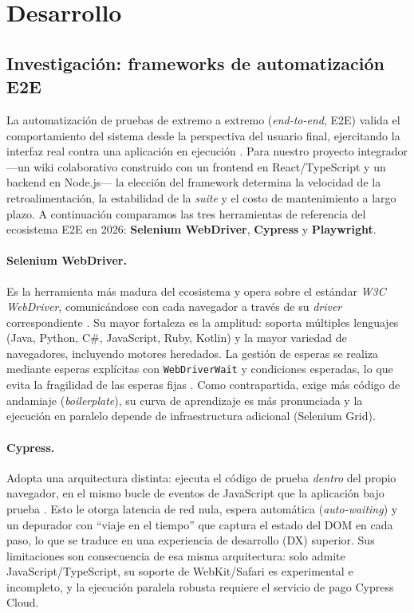 \documentclass[12pt]{article}
\begin{document}
\section{Desarrollo}
\subsection{Investigación: frameworks de automatización E2E}
\label{sec:4-1}

La automatización de pruebas de extremo a extremo (\textit{end-to-end}, E2E) valida
el comportamiento del sistema desde la perspectiva del usuario final, ejercitando la
interfaz real contra una aplicación en ejecución \citep{jorgensen2022}. Para nuestro
proyecto integrador ---un wiki colaborativo construido con un frontend en
React/TypeScript y un backend en Node.js--- la elección del framework determina la
velocidad de la retroalimentación, la estabilidad de la \textit{suite} y el costo de
mantenimiento a largo plazo. A continuación comparamos las tres herramientas de
referencia del ecosistema E2E en 2026: \textbf{Selenium WebDriver}, \textbf{Cypress} y
\textbf{Playwright}.

\paragraph{Selenium WebDriver.}
Es la herramienta más madura del ecosistema y opera sobre el estándar
\textit{W3C WebDriver}, comunicándose con cada navegador a través de su \textit{driver}
correspondiente \citep{seleniumdocs}. Su mayor fortaleza es la amplitud: soporta
múltiples lenguajes (Java, Python, C\#, JavaScript, Ruby, Kotlin) y la mayor variedad de
navegadores, incluyendo motores heredados. La gestión de esperas se realiza mediante
esperas explícitas con \texttt{WebDriverWait} y condiciones esperadas, lo que evita la
fragilidad de las esperas fijas \citep{garcia2022}. Como contrapartida, exige más
código de andamiaje (\textit{boilerplate}), su curva de aprendizaje es más pronunciada y
la ejecución en paralelo depende de infraestructura adicional (Selenium Grid).

\paragraph{Cypress.}
Adopta una arquitectura distinta: ejecuta el código de prueba \emph{dentro} del propio
navegador, en el mismo bucle de eventos de JavaScript que la aplicación bajo prueba
\citep{cypressdocs}. Esto le otorga latencia de red nula, espera automática
(\textit{auto-waiting}) y un depurador con ``viaje en el tiempo'' que captura el estado
del DOM en cada paso, lo que se traduce en una experiencia de desarrollo (DX) superior.
Sus limitaciones son consecuencia de esa misma arquitectura: solo admite
JavaScript/TypeScript, su soporte de WebKit/Safari es experimental e incompleto, y la
ejecución paralela robusta requiere el servicio de pago Cypress Cloud.
\end{document}
